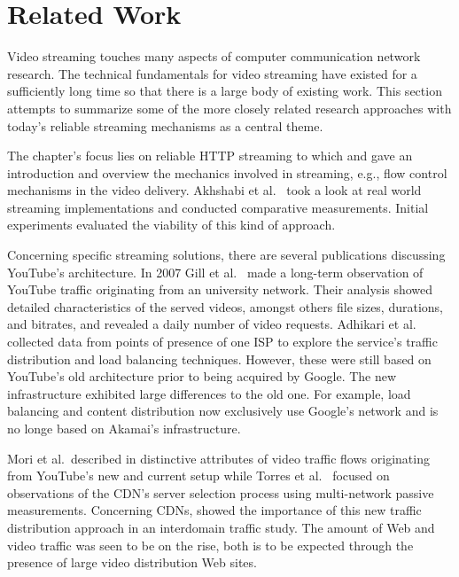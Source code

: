 \section{Related Work}

Video streaming touches many aspects of computer communication network research. The technical fundamentals for video streaming have existed for a sufficiently long time so that there is a large body of existing work. This section attempts to summarize some of the more closely related research approaches with today's reliable streaming mechanisms as a central theme.

The chapter's focus lies on reliable \gls{HTTP} streaming to which \cite{watching-video1,watching-video2} and \cite{ma2011mobile} gave an introduction and overview the mechanics involved in streaming, e.g., flow control mechanisms in the video delivery. Akhshabi et al.~\cite{akhshabi2011experimental} took a look at real world streaming implementations and conducted comparative measurements. Initial experiments evaluated the viability of this kind of approach. 

Concerning specific streaming solutions, there are several publications discussing YouTube's architecture. In 2007 Gill et al.~\cite{gill2007youtube} made a long-term observation of YouTube traffic originating from an university network. Their analysis showed detailed characteristics of the served videos, amongst others file sizes, durations, and bitrates, and revealed a daily number of video requests. Adhikari et al.~\cite{adhikari2010youtube} collected data from points of presence of one \gls{ISP} to explore the service's traffic distribution and load balancing techniques. However, these were still based on YouTube's old architecture prior to being acquired by Google. The new infrastructure exhibited large differences to the old one. For example, load balancing and content distribution now exclusively use Google's network and is no longe based on Akamai's infrastructure. 

Mori et al.\ described in \cite{mori2010characterizing} distinctive attributes of video traffic flows originating from YouTube's new and current setup while Torres et al.~\cite{torres2011dissecting} focused on observations of the \gls{CDN}'s server selection process using multi-network passive measurements. Concerning \glspl{CDN}, \cite{Labovitz:2010:IIT:2043164.1851194} showed the importance of this new traffic distribution approach in an interdomain traffic study. The amount of Web and video traffic was seen to be on the rise, both is to be expected through the presence of large video distribution Web sites.


